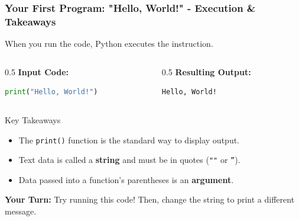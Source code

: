 \documentclass{beamer}
\begin{document}
\begin{frame}[fragile]
    \frametitle{Your First Program: "Hello, World!" - Execution \& Takeaways}
    
    When you run the code, Python executes the instruction.
    
    \begin{columns}[T]
        \begin{column}{0.5\textwidth}
            \textbf{Input Code:}
            \begin{lstlisting}[language=Python]
print("Hello, World!")
            \end{lstlisting}
        \end{column}
        \begin{column}{0.5\textwidth}
            \textbf{Resulting Output:}
            \begin{verbatim}
Hello, World!
            \end{verbatim}
        \end{column}
    \end{columns}
    
    \begin{alertblock}{Key Takeaways}
        \begin{itemize}
            \item The \texttt{print()} function is the standard way to display output.
            \item Text data is called a \textbf{string} and must be in quotes (\texttt{""} or \texttt{''}).
            \item Data passed into a function's parentheses is an \textbf{argument}.
        \end{itemize}
    \end{alertblock}
    
    \textbf{Your Turn:} Try running this code! Then, change the string to print a different message.
    
\end{frame}
\end{document}
